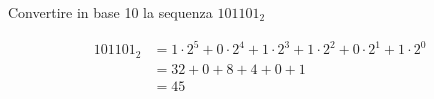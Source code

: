 \begin{Exercise}[label={ex:conv210}]
		Convertire in base 10 la sequenza $101101_2$ 

\end{Exercise}

\begin{Answer}[ref={ex:conv210}]
    \begin{align*}
      101101_2 &= 1 \cdot 2^5 + 0 \cdot 2^4 + 1 \cdot 2^3 + 1 \cdot 2^2 + 0 \cdot 2^1 + 1 \cdot 2^0 \\
      &= 32 + 0 + 8 + 4 + 0 + 1 \\
      &= 45
    \end{align*}
\end{Answer}